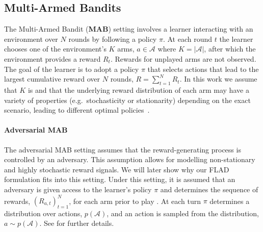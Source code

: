 \subsection{Multi-Armed Bandits}

The Multi-Armed Bandit (\textbf{MAB}) setting involves a learner interacting with an environment over $N$ rounds by following a policy $\pi$. At each round $t$ the learner chooses one of the environment's $K$ arms, $a\in\mathcal{A}$ where $K=\vert\mathcal{A}\vert$, after which the environment provides a reward $R_{t}$. Rewards for unplayed arms are not observed. The goal of the learner is to adopt a policy $\pi$ that selects actions that lead to the largest cumulative reward over $N$ rounds, $R=\sum_{t=1}^{N}R_{t}$.
In this work we assume that $K$ is and that the underlying reward distribution of each arm may have a variety of properties (e.g.\ stochasticity or stationarity) depending on the exact scenario, leading to different optimal policies~\citep{lattimore_szepesvári_2020}.

\paragraph{Adversarial MAB}
The adversarial MAB setting assumes that the reward-generating process is controlled by an adversary. This assumption allows for modelling non-stationary and highly stochastic reward signals.
We will later show why our FLAD formulation fits into this setting.
Under this setting, it is assumed that an adversary is given access to the learner's policy $\pi$ and determines the sequence of rewards, $(R_{a,t})_{t=1}^{N}$, for each arm prior to play \citep{auer1995gambling}. At each turn $\pi$ determines a distribution over actions, $p(\mathcal{A})$, and an action is sampled from the distribution, $a\sim p(\mathcal{A})$.
See \citet{lattimore_szepesvári_2020} for further details.

